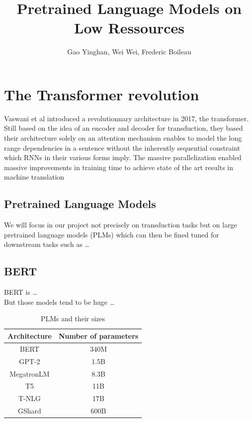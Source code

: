 \message{ !name(projectproposal.tex)}\documentclass{article}
\title{\textbf{Pretrained Language Models on Low Ressources}}
\author{Gao Yinghan, Wei Wei, Frederic Boileau}
\begin{document}

\thispagestyle{plain}
\maketitle
\medskip




\section{The Transformer revolution}
Vaswani et al \cite{allyouneed} introduced a revolutionnary
architecture in 2017, the transformer. Still based on the idea of an encoder and
decoder for transduction, they based their architecture solely on an attention
mechanism enables to model the long range dependencies in a sentence without the
inherently sequential constraint which RNNs in their various forms imply. The
massive parallelization enabled massive improvements in training time to achieve
state of the art results in machine translation\\


\subsection{Pretrained Language Models}
We will focus in our project not precisely on transduction tasks but on large
pretrained language models (PLMs) which can then be fined tuned for downstream
tasks such as \ldots\\


\subsection{BERT}
BERT is \ldots\cite{bert}\\


But those models tend to be huge \ldots
\begin{table}[h]
  \centering
  \begin{tabular}{cc}
    \toprule
    Architecture & Number of parameters\\
    \midrule
    BERT & 340M\\
    GPT-2 & 1.5B\\
    MegatronLM & 8.3B\\
    T5 & 11B\\
    T-NLG & 17B\\
    GShard & 600B
    \bottomrule
  \end{tabular}
  \caption{PLMs and their sizes}\cite{gupta2020compression}
\end{table}
\end{document}
